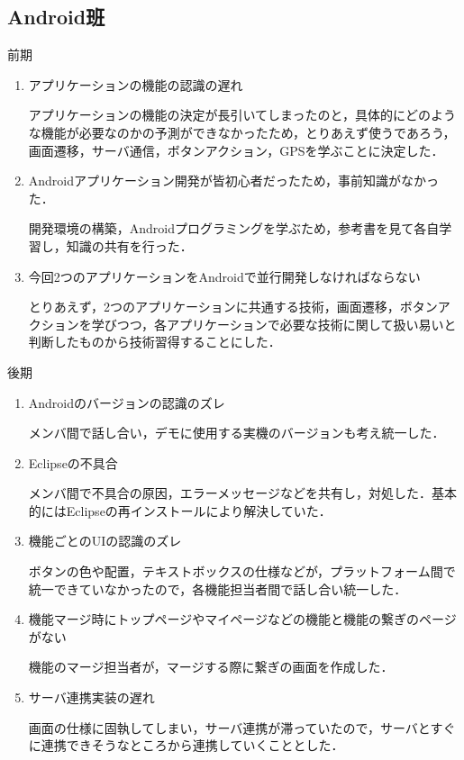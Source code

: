 \subsection{Android班}
前期
\\
\begin{enumerate}
\item アプリケーションの機能の認識の遅れ
\par
アプリケーションの機能の決定が長引いてしまったのと，具体的にどのような機能が必要なのかの予測ができなかったため，とりあえず使うであろう，画面遷移，サーバ通信，ボタンアクション，GPSを学ぶことに決定した．
\item Androidアプリケーション開発が皆初心者だったため，事前知識がなかった．
\par
開発環境の構築，Androidプログラミングを学ぶため，参考書を見て各自学習し，知識の共有を行った．
\item 今回2つのアプリケーションをAndroidで並行開発しなければならない
\par
とりあえず，2つのアプリケーションに共通する技術，画面遷移，ボタンアクションを学びつつ，各アプリケーションで必要な技術に関して扱い易いと判断したものから技術習得することにした．
\end{enumerate}
\par 後期
\\
\begin{enumerate}
\item Androidのバージョンの認識のズレ
\par
メンバ間で話し合い，デモに使用する実機のバージョンも考え統一した．
\item Eclipseの不具合
\par
メンバ間で不具合の原因，エラーメッセージなどを共有し，対処した．基本的にはEclipseの再インストールにより解決していた．
\item 機能ごとのUIの認識のズレ
\par
ボタンの色や配置，テキストボックスの仕様などが，プラットフォーム間で統一できていなかったので，各機能担当者間で話し合い統一した．
\item 機能マージ時にトップページやマイページなどの機能と機能の繋ぎのページがない
\par
機能のマージ担当者が，マージする際に繋ぎの画面を作成した．
\item サーバ連携実装の遅れ
\par
画面の仕様に固執してしまい，サーバ連携が滞っていたので，サーバとすぐに連携できそうなところから連携していくこととした．
\end{enumerate}
